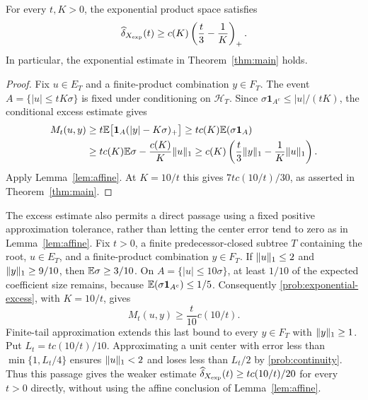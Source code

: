 \begin{proposition}\label{prop:exponential}
For every $t,K>0$, the exponential product space satisfies
\begin{equation}\label{eq:exponential-parameter}
 \widehat\delta_{X_{\mathrm{exp}}}(t)
 \ge c(K)\left(\frac t3-\frac1K\right)_+.
\end{equation}
In particular, the exponential estimate in Theorem~\ref{thm:main} holds.
\end{proposition}
\begin{proof}
Fix $u\in E_T$ and a finite-product combination $y\in F_T$. The event
$A=\{|u|\le tK\sigma\}$ is fixed under conditioning on $\mathcal H_T$.
Since $\sigma\mathbf1_{A^c}\le |u|/(tK)$, the conditional excess estimate
gives
\begin{align*}
 M_t(u,y)
 &\ge t\mathbb E\bigl[\mathbf1_A(|y|-K\sigma)_+\bigr]
 \ge t c(K)\mathbb E(\sigma\mathbf1_A)\\
 &\ge t c(K)\mathbb E\sigma-\frac{c(K)}K\lVert u\rVert_1
 \ge c(K)\left(\frac t3\lVert y\rVert_1-\frac1K\lVert u\rVert_1\right).
\end{align*}
Apply Lemma~\ref{lem:affine}. At $K=10/t$ this gives
$7t c(10/t)/30$, as asserted in Theorem~\ref{thm:main}.
\end{proof}

\begin{remark}\label{rem:finite-head}
The excess estimate also permits a direct passage using a fixed positive
approximation tolerance, rather than letting the center error tend to zero
as in Lemma~\ref{lem:affine}.
Fix $t>0$, a finite predecessor-closed subtree $T$ containing the root,
$u\in E_T$, and a finite-product combination $y\in F_T$.
If $\lVert u\rVert_1\le2$ and $\lVert y\rVert_1\ge9/10$, then $\mathbb E\sigma\ge3/10$. On
$A=\{|u|\le10\sigma\}$, at least $1/10$ of the expected coefficient
size remains, because $\mathbb E(\sigma\mathbf1_{A^c})\le1/5$. Consequently
\eqref{prob:exponential-excess}, with $K=10/t$, gives
\[
 M_t(u,y)\ge \frac t{10}c(10/t).
\]
Finite-tail approximation extends this last bound to every $y\in F_T$
with $\lVert y\rVert_1\ge1$. Put $L_t=t c(10/t)/10$. Approximating a unit center
with error less than $\min\{1,L_t/4\}$ ensures $\lVert u\rVert_1<2$ and loses
less than $L_t/2$ by \eqref{prob:continuity}. Thus this passage gives the
weaker estimate $\widehat\delta_{X_{\mathrm{exp}}}(t)\ge t c(10/t)/20$ for every
$t>0$ directly, without using the affine conclusion of Lemma~\ref{lem:affine}.
\end{remark}
